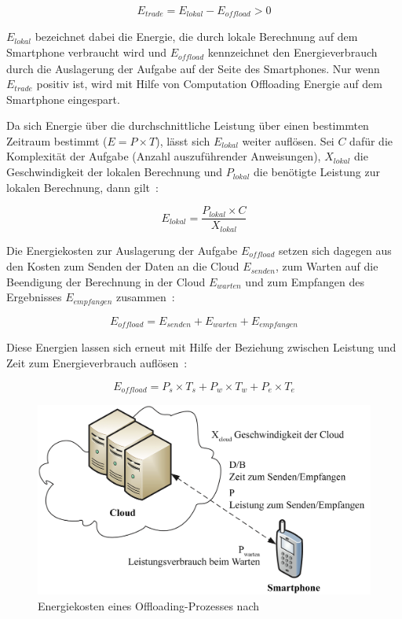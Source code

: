 \documentclass{sigchi}
\begin{document}
\begin{equation*}
	E_{\textit{trade}} = E_{\textit{lokal}} -E_{\textit{offload}} > 0
\end{equation*}

$E_{\textit{lokal}}$ bezeichnet dabei die Energie, die durch lokale Berechnung auf dem Smartphone verbraucht wird und $E_{\textit{offload}}$ kennzeichnet den Energieverbrauch durch die Auslagerung der Aufgabe auf der Seite des Smartphones.
Nur wenn $E_{\textit{trade}}$ positiv ist, wird mit Hilfe von Computation Offloading Energie auf dem Smartphone eingespart.

Da sich Energie über die durchschnittliche Leistung über einen bestimmten Zeitraum bestimmt ($E = P \times T$), lässt sich $E_{\textit{lokal}}$ weiter auflösen.
Sei $C$ dafür die Komplexität der Aufgabe (Anzahl auszuführender Anweisungen), $X_{\textit{lokal}}$ die Geschwindigkeit der lokalen Berechnung und $P_{\textit{lokal}}$ die benötigte Leistung zur lokalen Berechnung, dann gilt~\cite{o8}:

\begin{equation*}
	E_{\textit{lokal}} = \frac{P_\textit{lokal} \times C}{X_\textit{lokal}}
\end{equation*}

Die Energiekosten zur Auslagerung der Aufgabe $E_{\textit{offload}}$ setzen sich dagegen aus den Kosten zum Senden der Daten an die Cloud $E_{\textit{senden}}$, zum Warten auf die Beendigung der Berechnung in der Cloud $E_{\textit{warten}}$ und zum Empfangen des Ergebnisses $E_{\textit{empfangen}}$ zusammen~\cite{o8}:

\begin{equation*}
	E_{\textit{offload}} = E_{\textit{senden}} + E_{\textit{warten}} + E_{\textit{empfangen}}
\end{equation*}

Diese Energien lassen sich erneut mit Hilfe der Beziehung zwischen Leistung und Zeit zum Energieverbrauch auflösen~\cite{o8}:

\begin{equation*}
	E_{\textit{offload}} = P_s \times T_s + P_w \times T_w + P_e \times T_e
\end{equation*}

\begin{figure}
\centering
  \includegraphics[width=1.0\columnwidth]{images/trade-off}
  \caption{Energiekosten eines Offloading-Prozesses nach~\protect\cite{O13}}\label{fig:trade-off}
\end{figure}
\end{document}
